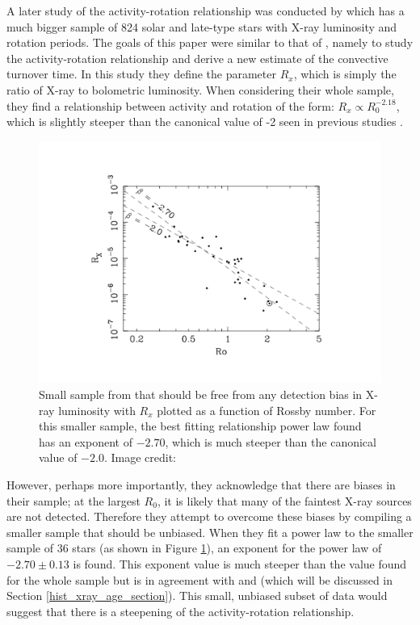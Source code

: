 A later study of the activity-rotation relationship was conducted by \citet{Wright_etal_2011} which has a much bigger sample of 824 solar and late-type stars with X-ray luminosity and rotation periods. The goals of this paper were similar to that of \citet{Pizzolato_etal_2003}, namely to study the activity-rotation relationship and derive a new estimate of the convective turnover time. In this study they define the parameter $R_{x}$, which is simply the ratio of X-ray to bolometric luminosity. When considering their whole sample, they find a relationship between activity and rotation of the form: $R_{x} \propto R_{0}^{-2.18}$, which is slightly steeper than the canonical value of -2 seen in previous studies \citep{Pallavicini_etal_1981,Pizzolato_etal_2003}.

\begin{figure}
    \centering
    \includegraphics[scale=0.55]{Figures/2-Historical_overview/wright_etal_fig_3.pdf}
    \caption[Activity-rotation relationship for small, unbiased subset of \citet{Wright_etal_2011} data]{Small sample from \citet{Wright_etal_2011} that should be free from any detection bias in X-ray luminosity with $R_{x}$ plotted as a function of Rossby number. For this smaller sample, the best fitting relationship power law found has an exponent of $-2.70$, which is much steeper than the canonical value of $-2.0$. Image credit: \citet{Wright_etal_2011}}
    \label{fig:wright_etal_2011_plot}
\end{figure}

However, perhaps more importantly, they acknowledge that there are biases in their sample; at the largest $R_{0}$, it is likely that many of the faintest X-ray sources are not detected. Therefore they attempt to overcome these biases by compiling a smaller sample that should be unbiased. When they fit a power law to the smaller sample of 36 stars (as shown in Figure \ref{fig:wright_etal_2011_plot}), an exponent for the power law of $-2.70 \pm 0.13$ is found. This exponent value is much steeper than the value found for the whole sample but is in agreement with \citet{Gudel_etal_1997} and \citet{Feigelson_etal_2004} (which will be discussed in Section \ref{hist_xray_age_section}). This small, unbiased subset of data would suggest that there is a steepening of the activity-rotation relationship.

